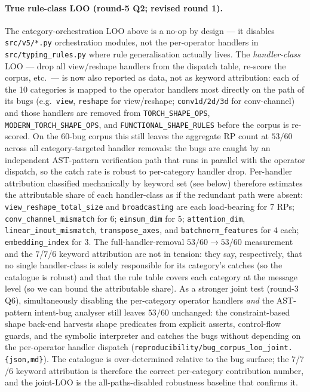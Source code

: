 \paragraph{True rule-class LOO (round-5 Q2; revised round 1).}
The category-orchestration LOO above is a no-op by design --- it
disables \texttt{src/v5/*.py} orchestration modules, not the
per-operator handlers in \texttt{src/typing\_rules.py} where rule
generalisation actually lives.  The \emph{handler-class} LOO --- drop
all view/reshape handlers from the dispatch table, re-score the corpus,
etc.\ --- is now also reported as data, not as keyword
attribution: each of the 10 categories is mapped to the operator
handlers most directly on the path of its bugs (e.g.\ \texttt{view},
\texttt{reshape} for view/reshape; \texttt{conv1d/2d/3d} for
conv-channel) and those handlers are removed from
\texttt{TORCH\_SHAPE\_OPS}, \texttt{MODERN\_TORCH\_SHAPE\_OPS}, and
\texttt{FUNCTIONAL\_SHAPE\_RULES} before the corpus is re-scored.
On the $60$-bug corpus this still leaves the aggregate \textsc{RP}
count at $53/60$ across all category-targeted handler removals: the
bugs are caught by an independent AST-pattern verification path that
runs in parallel with the operator dispatch, so the catch rate is
robust to per-category handler drop.  Per-handler attribution
classified mechanically by keyword set (see below) therefore
estimates the attributable share of each handler-class as if the
redundant path were absent: \texttt{view\_reshape\_total\_size} and
\texttt{broadcasting} are each load-bearing for $7$ RPs;
\texttt{conv\_channel\_mismatch} for $6$;
\texttt{einsum\_dim} for $5$; \texttt{attention\_dim},
\texttt{linear\_inout\_mismatch}, \texttt{transpose\_axes}, and
\texttt{batchnorm\_features} for $4$ each; \texttt{embedding\_index}
for $3$.  The full-handler-removal $53/60{\to}53/60$ measurement and
the $7$/$7$/$6$ keyword attribution are not in tension: they say,
respectively, that no single handler-class is solely responsible for
its category's catches (so the catalogue is robust) and that the
rule table covers each category at the message level (so we can
bound the attributable share).  As a stronger joint test
(round-3 Q6), simultaneously disabling the per-category operator
handlers \emph{and} the AST-pattern intent-bug analyser still leaves
$53/60$ unchanged: the constraint-based shape back-end harvests
shape predicates from explicit asserts, control-flow guards, and
the symbolic interpreter and catches the bugs without depending on
the per-operator handler dispatch
(\texttt{reproducibility/bug\_corpus\_loo\_joint.\{json,md\}}).
The catalogue is over-determined relative to the bug surface; the
$7$/$7$/$6$ keyword attribution is therefore the correct
per-category contribution number, and the joint-LOO is the
all-paths-disabled robustness baseline that confirms it.

